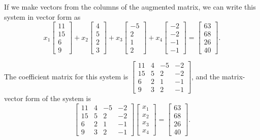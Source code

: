 \begin{example}
\item If we make vectors from the columns of the augmented matrix, we can write this system in vector form as
\[x_1 \left[ \begin{array}{c} 11 \\ 15 \\ 6 \\ 9 \end{array} \right] + x_2 \left[ \begin{array}{c} 4 \\ 5 \\ 2 \\ 3 \end{array} \right] + x_3 \left[ \begin{array}{r} -5 \\ 2\\ 1 \\ 2 \end{array} \right] + x_4 \left[ \begin{array}{r} -2\\ -2 \\ -1 \\ -1 \end{array} \right] = \left[ \begin{array}{c} 63 \\ 68 \\ 26 \\ 40 \end{array} \right].\]

\item The coefficient matrix for this system is $\left[ \begin{array}{ccrr} 11&4&-5&-2 \\ 15&5&2&-2 \\ 6&2&1&-1 \\ 9&3&2&-1 \end{array} \right]$, and the matrix-vector form of the system is 
\[\left[ \begin{array}{ccrr} 11&4&-5&-2 \\ 15&5&2&-2 \\ 6&2&1&-1 \\ 9&3&2&-1 \end{array} \right] \left[ \begin{array}{c} x_1\\x_2\\x_3\\x_4 \end{array} \right] = \left[ \begin{array}{c} 63 \\ 68 \\ 26 \\ 40 \end{array} \right].\]
\ea


\end{example}
